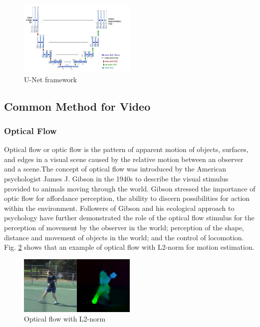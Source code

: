 \begin{figure}[ht]
    \centering
    \includegraphics[width=0.5\textwidth]{./figure/unet.png}
    \caption{U-Net framework}
    \label{unet}
\end{figure}

\subsection{Common Method for Video}

\subsubsection{Optical Flow}
Optical flow or optic flow is the pattern of apparent motion of objects, surfaces, and edges in a visual scene caused by the relative motion between an observer and a scene.The concept of optical flow was introduced by the American psychologist James J. Gibson in the 1940s to describe the visual stimulus provided to animals moving through the world.\cite{OpticalFlow} Gibson stressed the importance of optic flow for affordance perception, the ability to discern possibilities for action within the environment. Followers of Gibson and his ecological approach to psychology have further demonstrated the role of the optical flow stimulus for the perception of movement by the observer in the world; perception of the shape, distance and movement of objects in the world; and the control of locomotion. Fig. \ref{optical flow} shows that an example of optical flow with L2-norm for motion estimation. 

\begin{figure}[ht]
    \centering
    \includegraphics[width=0.5\textwidth]{./figure/opticalflow.png}
    \caption{Optical flow with L2-norm}
    \label{optical flow}
\end{figure}


